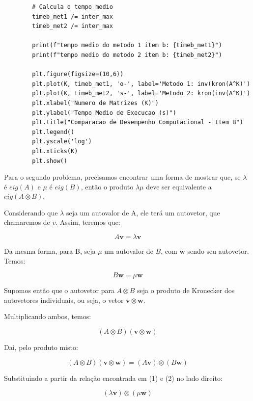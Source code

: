\documentclass[a4paper, 12pt]{article}
\begin{document}
\begin{lstlisting}
		# Calcula o tempo medio
		timeb_met1 /= inter_max
		timeb_met2 /= inter_max
		
		print(f"tempo medio do metodo 1 item b: {timeb_met1}")
		print(f"tempo medio do metodo 2 item b: {timeb_met2}")
		
		plt.figure(figsize=(10,6))
		plt.plot(K, timeb_met1, 'o-', label='Metodo 1: inv(kron(A^K)')
		plt.plot(K, timeb_met2, 's-', label='Metodo 2: kron(inv(A^K)')
		plt.xlabel("Numero de Matrizes (K)")
		plt.ylabel("Tempo Medio de Execucao (s)")
		plt.title("Comparacao de Desempenho Computacional - Item B")
		plt.legend()
		plt.yscale('log')
		plt.xticks(K)
		plt.show()
	\end{lstlisting}
	
	Para o segundo problema, precisamos encontrar uma forma de mostrar que, se $\lambda$ é $eig(A)$ e $\mu$ é $eig(B)$, então o produto $\lambda\mu$ deve ser equivalente a $eig(A \otimes B)$.
	
	Considerando que $\lambda$ seja um autovalor de A, ele terá um autovetor, que chamaremos de $v$. Assim, teremos que: 
	
	\begin{equation}
		A\mathbf{v} = \lambda \mathbf{v}    
	\end{equation}
	
	Da mesma forma, para B, seja $\mu$ um autovalor de $B$, com $\mathbf{w}$ sendo seu autovetor. Temos:
	
	
	\begin{equation}
		B\mathbf{w} = \mu \mathbf{w}
	\end{equation}
	
	
	Supomos então que o autovetor para $A \otimes B$ seja o produto de Kronecker dos autovetores individuais, ou seja, o vetor $\mathbf{v} \otimes \mathbf{w}$.
	
	Multiplicando ambos, temos: 
	
	
	\begin{equation}
		(A \otimes B)(\mathbf{v} \otimes \mathbf{w})
	\end{equation}
	
	Dai, pelo produto misto:
	
	\begin{equation}
		(A \otimes B)(\mathbf{v} \otimes \mathbf{w}) = (A\mathbf{v}) \otimes (B\mathbf{w})
	\end{equation}
	
	Substituindo a partir da relação encontrada em (1) e (2) no lado direito:
	
	\begin{equation}
		(\lambda \mathbf{v}) \otimes (\mu \mathbf{w})
	\end{equation}
	
\end{document}
